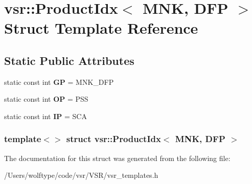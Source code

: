 \hypertarget{structvsr_1_1_product_idx_3_01_m_n_k_00_01_d_f_p_01_4}{\section{vsr\-:\-:Product\-Idx$<$ M\-N\-K, D\-F\-P $>$ Struct Template Reference}
\label{structvsr_1_1_product_idx_3_01_m_n_k_00_01_d_f_p_01_4}
}
\subsection*{Static Public Attributes}
\begin{DoxyCompactItemize}
\item 
\hypertarget{structvsr_1_1_product_idx_3_01_m_n_k_00_01_d_f_p_01_4_a1f0fe22f99bf80e55d85147bc0ae52c6}{static const int {\bfseries G\-P} = M\-N\-K\-\_\-\-D\-F\-P}\label{structvsr_1_1_product_idx_3_01_m_n_k_00_01_d_f_p_01_4_a1f0fe22f99bf80e55d85147bc0ae52c6}

\item 
\hypertarget{structvsr_1_1_product_idx_3_01_m_n_k_00_01_d_f_p_01_4_a64c4ff2169ba7e27d9a3b36be040def1}{static const int {\bfseries O\-P} = P\-S\-S}\label{structvsr_1_1_product_idx_3_01_m_n_k_00_01_d_f_p_01_4_a64c4ff2169ba7e27d9a3b36be040def1}

\item 
\hypertarget{structvsr_1_1_product_idx_3_01_m_n_k_00_01_d_f_p_01_4_a0fcadb3ba516bb5eca5733ec89f33786}{static const int {\bfseries I\-P} = S\-C\-A}\label{structvsr_1_1_product_idx_3_01_m_n_k_00_01_d_f_p_01_4_a0fcadb3ba516bb5eca5733ec89f33786}

\end{DoxyCompactItemize}
\subsubsection*{template$<$$>$ struct vsr\-::\-Product\-Idx$<$ M\-N\-K, D\-F\-P $>$}



The documentation for this struct was generated from the following file\-:\begin{DoxyCompactItemize}
\item 
/\-Users/wolftype/code/vsr/\-V\-S\-R/vsr\-\_\-templates.\-h\end{DoxyCompactItemize}
